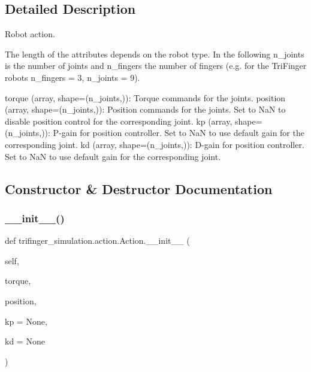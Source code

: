 \subsection{Detailed Description}
Robot action. 

The length of the attributes depends on the robot type. In the following {\ttfamily n\+\_\+joints} is the number of joints and {\ttfamily n\+\_\+fingers} the number of fingers (e.\+g. for the Tri\+Finger robots {\ttfamily n\+\_\+fingers = 3, n\+\_\+joints = 9}).

\begin{DoxyVerb}    torque (array, shape=(n_joints,)):  Torque commands for the joints.
    position (array, shape=(n_joints,)):  Position commands for the joints.
        Set to NaN to disable position control for the corresponding joint.
    kp (array, shape=(n_joints,)):  P-gain for position controller.  Set to
        NaN to use default gain for the corresponding joint.
    kd (array, shape=(n_joints,)):  D-gain for position controller.  Set to
        NaN to use default gain for the corresponding joint.\end{DoxyVerb}
 

\subsection{Constructor \& Destructor Documentation}
\mbox{\label{classtrifinger__simulation_1_1action_1_1Action_a8cf3247a4080f46bc05c62ba66ec8016}} 
\subsubsection{\texorpdfstring{\+\_\+\+\_\+init\+\_\+\+\_\+()}{\_\_init\_\_()}}
{\footnotesize\ttfamily def trifinger\+\_\+simulation.\+action.\+Action.\+\_\+\+\_\+init\+\_\+\+\_\+ (\begin{DoxyParamCaption}\item[{}]{self,  }\item[{}]{torque,  }\item[{}]{position,  }\item[{}]{kp = {\ttfamily None},  }\item[{}]{kd = {\ttfamily None} }\end{DoxyParamCaption})}



